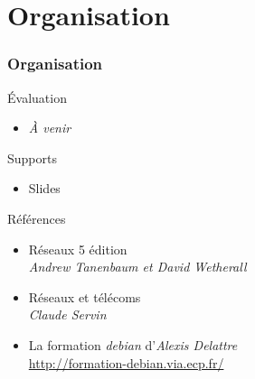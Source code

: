 \section{Organisation}

\begin{frame}[fragile]
  \frametitle{Organisation}
Évaluation
\begin{itemize}
	\item \textit{À venir}
\end{itemize}

Supports
\begin{itemize}
	\item Slides
\end{itemize}

Références
	\begin{itemize}
		\item Réseaux 5\raisebox{5pt}{\scriptsize e} édition \\ 
		\textit{Andrew Tanenbaum et David Wetherall}
		\item Réseaux et télécoms \\
		\textit{Claude Servin}
		\item La formation \textit{debian} d'\textit{Alexis Delattre} \\
		\url{http://formation-debian.via.ecp.fr/}
	\end{itemize}
\end{frame}

